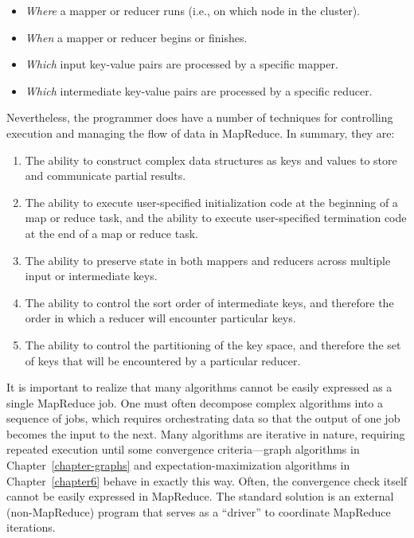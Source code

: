 \begin{itemize}

\item \emph{Where} a mapper or reducer runs (i.e., on which node in the
  cluster).

\item \emph{When} a mapper or reducer begins or finishes.

\item \emph{Which} input key-value pairs are processed by a specific
  mapper.

\item \emph{Which} intermediate key-value pairs are processed by a
  specific reducer.

\end{itemize}

\noindent Nevertheless, the programmer does have a number of
techniques for controlling execution and managing the flow of data in
MapReduce.  In summary, they are:

\begin{enumerate}

\item The ability to construct complex data structures as keys and
  values to store and communicate partial results.

\item The ability to execute user-specified initialization code at the
  beginning of a map or reduce task, and the ability to execute
  user-specified termination code at the end of a map or reduce task.

\item The ability to preserve state in both mappers and reducers
  across multiple input or intermediate keys.

\item The ability to control the sort order of intermediate keys, and
  therefore the order in which a reducer will encounter particular
  keys.

\item The ability to control the partitioning of the key space, and
  therefore the set of keys that will be encountered by a particular
  reducer.

\end{enumerate}

\noindent It is important to realize that many algorithms cannot be
easily expressed as a single MapReduce job.  One must often decompose
complex algorithms into a sequence of jobs, which requires
orchestrating data so that the output of one job becomes the input to
the next.  Many algorithms are iterative in nature, requiring repeated
execution until some convergence criteria---graph algorithms in
Chapter~\ref{chapter-graphs} and expectation-maximization algorithms
in Chapter~\ref{chapter6} behave in exactly this way.  Often, the
convergence check itself cannot be easily expressed in MapReduce.  The
standard solution is an external (non-MapReduce) program that serves
as a ``driver'' to coordinate MapReduce iterations.

